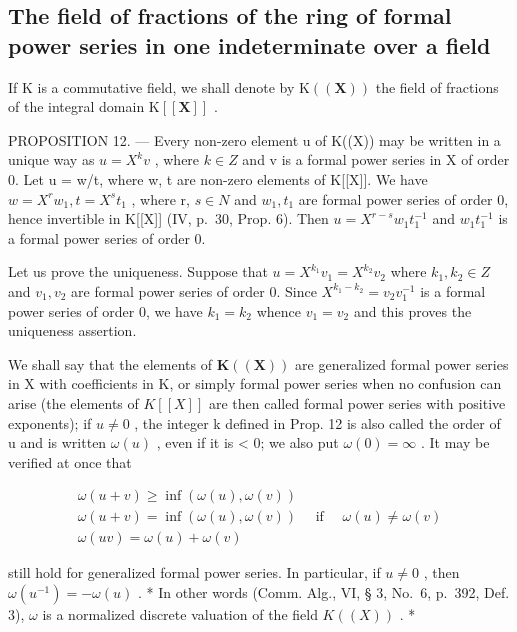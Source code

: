 \subsection{The field of fractions of the ring of formal power series in one indeterminate over a field}

If K is a commutative field, we shall denote by \(\mathrm{K}((\mathbf{X}))\) the field of fractions of the integral domain \(\mathrm{K}[[\mathbf{X}]]\) .

PROPOSITION 12. --- Every non-zero element u of K((X)) may be written in a unique way as \(u = X^{k}v\) , where \(k \in Z\) and v is a formal power series in X of order 0. Let u = w/t, where w, t are non-zero elements of K{[}{[}X{]}{]}. We have \(w = X^{r}w_{1}, t = X^{s}t_{1}\) , where r, \(s \in N\) and \(w_{1}, t_{1}\) are formal power series of order 0, hence invertible in K{[}{[}X{]}{]} (IV, p.~30, Prop. 6). Then \(u = X^{r-s}w_{1}t_{1}^{-1}\) and \(w_{1}t_{1}^{-1}\) is a formal power series of order 0.

Let us prove the uniqueness. Suppose that \(u = X^{k_{1}}v_{1} = X^{k_{2}}v_{2}\) where \(k_{1}, k_{2} \in Z\) and \(v_{1}, v_{2}\) are formal power series of order 0. Since \(X^{k_{1}-k_{2}} = v_{2}v_{1}^{-1}\) is a formal power series of order 0, we have \(k_{1} = k_{2}\) whence \(v_{1} = v_{2}\) and this proves the uniqueness assertion.

We shall say that the elements of \(\mathbf{K}((\mathbf{X}))\) are generalized formal power series in X with coefficients in K, or simply formal power series when no confusion can arise (the elements of \(K[[X]]\) are then called formal power series with positive exponents); if \(u \neq 0\) , the integer k defined in Prop. 12 is also called the order of u and is written \(\omega(u)\) , even if it is \textless{} 0; we also put \(\omega(0) = \infty\) . It may be verified at once that

\[
\begin{array}{l} \omega (u + v) \geqslant \inf (\omega (u), \omega (v)) \\ \omega (u + v) = \inf (\omega (u), \omega (v)) \quad \text { if } \quad \omega (u) \neq \omega (v) \\ \omega (u v) = \omega (u) + \omega (v) \end{array}
\]

still hold for generalized formal power series. In particular, if \(u \neq 0\) , then \(\omega(u^{-1}) = -\omega(u)\) . * In other words (Comm. Alg., VI, § 3, No.~6, p.~392, Def. 3), \(\omega\) is a normalized discrete valuation of the field \(K((X))\) . *

